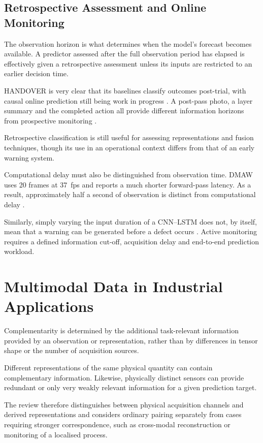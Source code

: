\subsection{Retrospective Assessment and Online Monitoring}

The observation horizon is what determines when the model's forecast becomes available. A predictor
assessed after the full observation period has elapsed is effectively given a retrospective
assessment unless its inputs are restricted to an earlier decision time.

HANDOVER is very clear that its baselines classify outcomes post-trial, with causal online
prediction still being work in progress \parencite[PDF p.~7 Section~VI]{Thoduka2024Handover}. A
post-pass photo, a layer summary and the completed action all provide different information horizons
from prospective monitoring \parencite{P045,Petrich2021Multimodal}.

Retrospective classification is still useful for assessing representations and fusion techniques,
though its use in an operational context differs from that of an early warning system.

Computational delay must also be distinguished from observation time. DMAW uses 20 frames at 37~fps
and reports a much shorter forward-pass latency. As a result, approximately half a second of
observation is distinct from computational delay \parencite[PDF pp.~6--7]{P003}.

Similarly, simply varying the input duration of a CNN--LSTM does not, by itself, mean that a warning
can be generated before a defect occurs \parencite{Pandiyan2022Deep}. Active monitoring requires a
defined information cut-off, acquisition delay and end-to-end prediction workload.

\section{Multimodal Data in Industrial Applications}

Complementarity is determined by the additional task-relevant information provided by an observation
or representation, rather than by differences in tensor shape or the number of acquisition sources.

Different representations of the same physical quantity can contain complementary information.
Likewise, physically distinct sensors can provide redundant or only very weakly relevant information
for a given prediction target.

The review therefore distinguishes between physical acquisition channels and derived representations
and considers ordinary pairing separately from cases requiring stronger correspondence, such as
cross-modal reconstruction or monitoring of a localised process.

